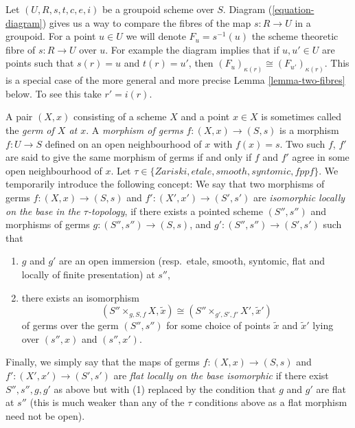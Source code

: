 \noindent
Let $(U, R, s, t, c, e, i)$ be a groupoid scheme over $S$.
Diagram (\ref{equation-diagram})
gives us a way to compare the fibres of the map $s : R \to U$ in a groupoid.
For a point $u \in U$ we will denote $F_u = s^{-1}(u)$ the scheme
theoretic fibre of $s : R \to U$ over $u$. For example the diagram
implies that if $u, u' \in U$ are points such
that $s(r) = u$ and $t(r) = u'$, then
$(F_u)_{\kappa(r)} \cong (F_{u'})_{\kappa(r)}$.
This is a special case of the more general and more precise
Lemma \ref{lemma-two-fibres}
below. To see this take $r' = i(r)$.

\medskip\noindent
A pair $(X, x)$ consisting of a scheme $X$ and a point $x \in X$ is sometimes
called the {\it germ of $X$ at $x$}.
A {\it morphism of germs} $f : (X, x) \to (S, s)$
is a morphism $f : U \to S$ defined on an open neighbourhood
of $x$ with $f(x) = s$. Two such
$f$, $f'$ are said to give the same morphism of germs
if and only if $f$ and $f'$ agree in some open neighbourhood of $x$.
Let $\tau \in \{Zariski, etale, smooth, syntomic, fppf\}$.
We temporarily introduce the following concept: We say that two morphisms
of germs $f : (X, x) \to (S, s)$ and $f' : (X', x') \to (S', s')$
are {\it isomorphic locally on the base in the $\tau$-topology},
if there exists a pointed scheme $(S'', s'')$ and morphisms of germs
$g : (S'', s'') \to (S, s)$, and $g' : (S'', s'') \to (S', s')$
such that
\begin{enumerate}
\item $g$ and $g'$ are an open immersion (resp.\ etale, smooth, syntomic,
flat and locally of finite presentation) at $s''$,
\item there exists an isomorphism
$$
(S'' \times_{g, S, f} X, \tilde x)
\cong
(S'' \times_{g', S', f'} X', \tilde  x')
$$
of germs over the germ $(S'', s'')$ for some choice of points
$\tilde x$ and $\tilde x'$ lying over $(s'', x)$ and $(s'', x')$.
\end{enumerate}
Finally, we simply say that the maps of germs
$f : (X, x) \to (S, s)$ and $f' : (X', x') \to (S', s')$
are {\it flat locally on the base isomorphic} if there exist
$S'', s'', g, g'$ as above but with (1) replaced by
the condition that $g$ and $g'$ are flat at $s''$ (this is
much weaker than any of the $\tau$ conditions above
as a flat morphism need not be open).

